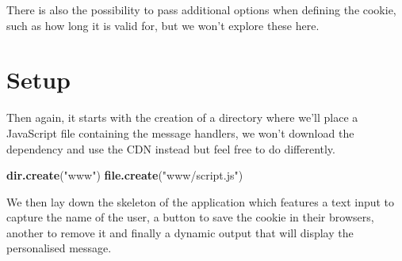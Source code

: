 \documentclass[
]{krantz}
\makeatletter
\newenvironment{Shaded}{\begin{snugshade}}{\end{snugshade}}
\newcommand{\ControlFlowTok}[1]{\textcolor[rgb]{0.27,0.27,0.27}{\textbf{#1}}}
\newcommand{\DataTypeTok}[1]{\textcolor[rgb]{0.27,0.27,0.27}{#1}}
\newcommand{\KeywordTok}[1]{\textcolor[rgb]{0.27,0.27,0.27}{\textbf{#1}}}
\newcommand{\NormalTok}[1]{#1}
\newcommand{\OperatorTok}[1]{\textcolor[rgb]{0.43,0.43,0.43}{\textbf{#1}}}
\newcommand{\StringTok}[1]{\textcolor[rgb]{0.5,0.5,0.5}{#1}}
\newenvironment{kframe}{%
\medskip{}
\setlength{\fboxsep}{.8em}
 \def\at@end@of@kframe{}%
 \ifinner\ifhmode%
  \def\at@end@of@kframe{\end{minipage}}%
  \begin{minipage}{\columnwidth}%
 \fi\fi%
 \def\FrameCommand##1{\hskip\@totalleftmargin \hskip-\fboxsep
 \colorbox{shadecolor}{##1}\hskip-\fboxsep
     \hskip-\linewidth \hskip-\@totalleftmargin \hskip\columnwidth}%
 \MakeFramed {\advance\hsize-\width
   \@totalleftmargin\z@ \linewidth\hsize
   \@setminipage}}%
 {\par\unskip\endMakeFramed%
 \at@end@of@kframe}
\renewenvironment{Shaded}{\begin{kframe}}{\end{kframe}}
\makeatother
\begin{document}
There is also the possibility to pass additional options when defining the cookie, such as how long it is valid for, but we won't explore these here.

\hypertarget{setup}{%
\section{Setup}\label{setup}}

Then again, it starts with the creation of a directory where we'll place a JavaScript file containing the message handlers, we won't download the dependency and use the CDN instead but feel free to do differently.

\begin{Shaded}
\begin{Highlighting}[]
\KeywordTok{dir.create}\NormalTok{(}\StringTok{"www"}\NormalTok{)}
\KeywordTok{file.create}\NormalTok{(}\StringTok{"www/script.js"}\NormalTok{)}
\end{Highlighting}
\end{Shaded}

We then lay down the skeleton of the application which features a text input to capture the name of the user, a button to save the cookie in their browsers, another to remove it and finally a dynamic output that will display the personalised message.

\begin{Shaded}
\end{Shaded}
\end{document}
